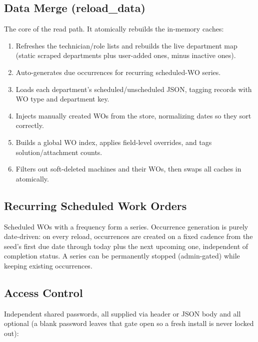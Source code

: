 \documentclass[11pt,a4paper]{article}
\begin{document}
\subsection{Data Merge (reload\_data)}
The core of the read path. It atomically rebuilds the in-memory caches:
\begin{enumerate}
    \item Refreshes the technician/role lists and rebuilds the live
          department map (static scraped departments plus user-added ones,
          minus inactive ones).
    \item Auto-generates due occurrences for recurring scheduled-WO series.
    \item Loads each department's scheduled/unscheduled JSON, tagging
          records with WO type and department key.
    \item Injects manually created WOs from the store, normalizing dates so
          they sort correctly.
    \item Builds a global WO index, applies field-level overrides, and
          tags solution/attachment counts.
    \item Filters out soft-deleted machines and their WOs, then swaps all
          caches in atomically.
\end{enumerate}

\subsection{Recurring Scheduled Work Orders}
Scheduled WOs with a frequency form a series. Occurrence generation is
purely date-driven: on every reload, occurrences are created on a fixed
cadence from the seed's first due date through today plus the next
upcoming one, independent of completion status. A series can be
permanently stopped (admin-gated) while keeping existing occurrences.

\subsection{Access Control}
Independent shared passwords, all supplied via header or JSON body and all
optional (a blank password leaves that gate open so a fresh install is
never locked out):
\end{document}
